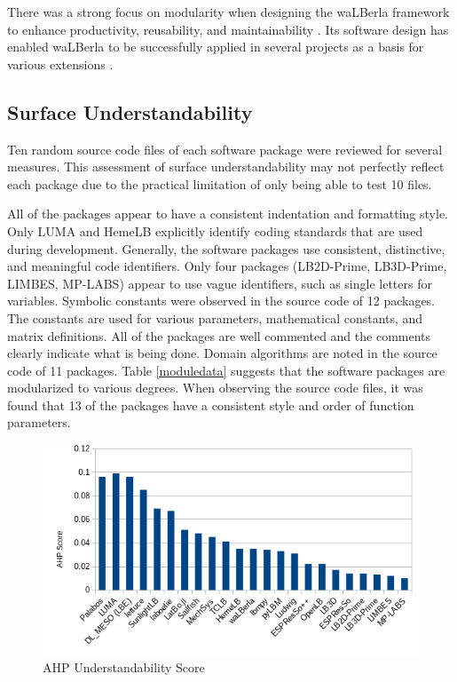 \documentclass[12pt, notitlepage]{article}
\begin{document}
There was a strong focus on modularity when designing the waLBerla framework to enhance productivity, reusability, and maintainability \citep{bauer2021walberla}. Its software design has enabled waLBerla to be successfully applied in several projects as a basis for various extensions \citep{bauer2021walberla}.

\subsection{Surface Understandability}

Ten random source code files of each software package were reviewed for several measures. This assessment of surface understandability may not perfectly reflect each package due to the practical limitation of only being able to test 10 files. 

All of the packages appear to have a consistent indentation and formatting style. Only LUMA and HemeLB explicitly identify coding standards that are used during development. Generally, the software packages use consistent, distinctive, and meaningful code identifiers. Only four packages (LB2D-Prime, LB3D-Prime, LIMBES, MP-LABS) appear to use vague identifiers, such as single letters for variables. Symbolic constants were observed in the source code of 12 packages. The constants are used for various parameters, mathematical constants, and matrix definitions. All of the packages are well commented and the comments clearly indicate what is being done. Domain algorithms are noted in the source code of 11 packages. Table \ref{moduledata} suggests that the software packages are modularized to various degrees. When observing the source code files, it was found that 13 of the packages have a consistent style and order of function parameters.

\begin{figure}[h!]
	\begin{center}
		\includegraphics[width=1.0\textwidth]{understandability_chart}
		\caption{AHP Understandability Score}
		\label{Fig_Understandability}
	\end{center}
\end{figure}
\end{document}
